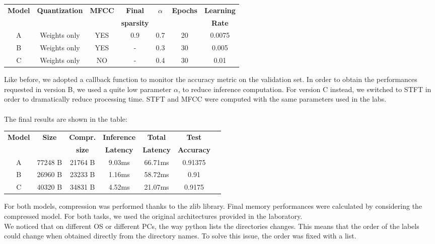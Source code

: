 \documentclass{article}
\begin{document}
\begin{center}
\begin{tabular}{|c|c|c|c|c|c|c|}
\hline
\vspace{-0.1cm}

\textbf{Model} &\textbf{Quantization} &\textbf{MFCC} &\textbf{Final} & \textbf{$\alpha$} &\textbf{Epochs} &\textbf{Learning} \\

&&&\textbf{sparsity}&&&\textbf{Rate} \\
\hline
A & Weights only & YES &0.9 & 0.7  & 20  & 0.0075\\
B& Weights only & YES &- &  0.3   & 30 & 0.005\\ 
C & Weights only & NO &- &  0.4   & 30 & 0.01\\ 

\hline
\end{tabular}
\end{center}
Like before, we adopted a callback function to monitor the accuracy metric on the validation set.
In order to obtain the performances requested in version B, we used a quite low parameter $\alpha$, to reduce inference computation. For version C instead, we switched to STFT in order to dramatically reduce processing time.
STFT and MFCC were computed with the same parameters used in the labs.
\\\\
The final results are shown in the table:
\begin{center}
\begin{tabular}{|c|c|c|c|c|c|c|}
\hline
\vspace{-0.1cm}

\textbf{Model} &\textbf{Size} &\textbf{Compr.}&  \textbf{Inference }& \textbf{Total}  &\textbf{Test} \\
&&\textbf{size}&\textbf{Latency}&\textbf{Latency}&\textbf{Accuracy}\\
\hline
A  & 77248 B & 21764 B & 9.03ms&   66.71ms  & 0.91375 \\ 
B  & 26960 B & 23233 B  &  1.16ms& 58.72ms & 0.91 \\ 
C  & 40320 B & 34831 B  & 4.52ms & 21.07ms  & 0.9175 \\ 

\hline
\end{tabular}
\end{center}
For both models, compression was performed thanks to the zlib library. Final memory performances were calculated by considering the compressed model.
For both tasks, we used the original architectures provided in the laboratory.
\\
We noticed that on different OS or different PCs, the way python lists the directories changes. This means that the order of the labels could change when obtained directly from the directory names.
To solve this issue, the order was fixed with a list.
\end{document}
